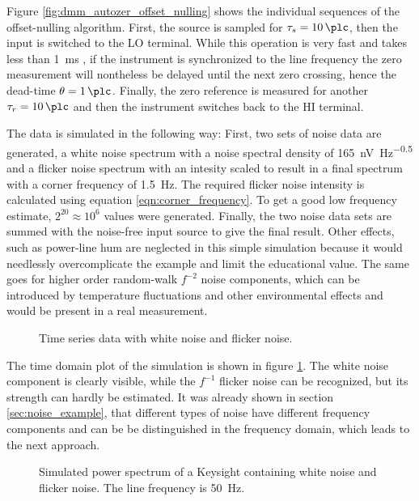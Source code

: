 Figure \ref{fig:dmm_autozer_offset_nulling} shows the individual sequences of the offset-nulling algorithm. First, the source is sampled for $\tau_s = \qty{10}{\plc}$, then the input is switched to the LO terminal. While this operation is very fast and takes less than \qty{1}{\ms} \cite{article_3458A_input_impedance}, if the instrument is synchronized to the line frequency the zero measurement will nontheless be delayed until the next zero crossing, hence the dead-time $\theta = \qty{1}{\plc}$. Finally, the zero reference is measured for another $\tau_r = \qty{10}{\plc}$ and then the instrument switches back to the HI terminal.

The data is simulated in the following way: First, two sets of noise data are generated, a white noise spectrum with a noise spectral density of \qty[power-half-as-sqrt, per-mode=symbol]{165}{\nV \Hz\tothe{-0.5}} and a flicker noise spectrum with an intesity scaled to result in a final spectrum with a corner frequency of \qty{1.5}{\Hz}. The required flicker noise intensity is calculated using equation \ref{eqn:corner_frequency}. To get a good low frequency estimate, $2^{20} \approx 10^{6}$ values were generated. Finally, the two noise data sets are summed with the noise-free input source to give the final result. Other effects, such as power-line hum are neglected in this simple simulation because it would needlessly overcomplicate the example and limit the educational value. The same goes for higher order random-walk $f^{-2}$ noise components, which can be introduced by temperature fluctuations and other environmental effects and would be present in a real measurement.

\begin{figure}[ht]
    \centering
    
    \caption{Time series data with white noise and flicker noise.}
    \label{fig:autozero_raw_time}
\end{figure}

The time domain plot of the simulation is shown in figure \ref{fig:autozero_raw_time}. The white noise component is clearly visible, while the $f^{-1}$ flicker noise can be recognized, but its strength can hardly be estimated. It was already shown in section \ref{sec:noise_example}, that different types of noise have different frequency components and can be be distinguished in the frequency domain, which leads to the next approach.

\begin{figure}[hb]
    \centering
    
    \caption{Simulated power spectrum of a Keysight  containing white noise and flicker noise. The line frequency is \qty{50}{\Hz}.}
    \label{fig:autozero_raw_psd}
\end{figure}

